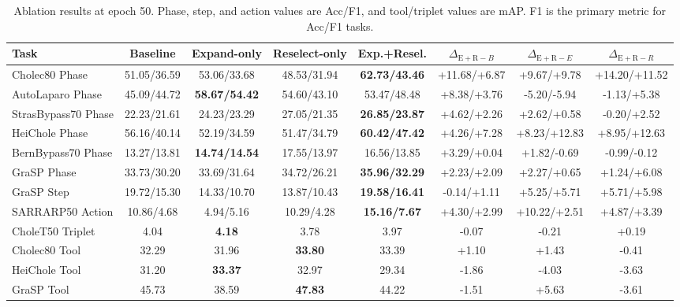 \begin{table}[t]
\centering
\scriptsize
\setlength{\tabcolsep}{2.4pt}
\renewcommand{\arraystretch}{1.04}
\caption{Ablation results at epoch 50. Phase, step, and action values are Acc/F1, and tool/triplet values are mAP. F1 is the primary metric for Acc/F1 tasks.}
\label{tab:ablation_results}
\begin{adjustbox}{max width=\textwidth}
\begin{tabular}{@{}lccccccc@{}}
\toprule
Task & Baseline & Expand-only & Reselect-only & Exp.+Resel. & $\Delta_{\mathrm{E+R}-B}$ & $\Delta_{\mathrm{E+R}-E}$ & $\Delta_{\mathrm{E+R}-R}$ \\
\midrule
Cholec80 Phase & 51.05/36.59 & 53.06/33.68 & 48.53/31.94 & \textbf{62.73/43.46} & +11.68/+6.87 & +9.67/+9.78 & +14.20/+11.52 \\
AutoLaparo Phase & 45.09/44.72 & \textbf{58.67/54.42} & 54.60/43.10 & 53.47/48.48 & +8.38/+3.76 & -5.20/-5.94 & -1.13/+5.38 \\
StrasBypass70 Phase & 22.23/21.61 & 24.23/23.29 & 27.05/21.35 & \textbf{26.85/23.87} & +4.62/+2.26 & +2.62/+0.58 & -0.20/+2.52 \\
HeiChole Phase & 56.16/40.14 & 52.19/34.59 & 51.47/34.79 & \textbf{60.42/47.42} & +4.26/+7.28 & +8.23/+12.83 & +8.95/+12.63 \\
BernBypass70 Phase & 13.27/13.81 & \textbf{14.74/14.54} & 17.55/13.97 & 16.56/13.85 & +3.29/+0.04 & +1.82/-0.69 & -0.99/-0.12 \\
GraSP Phase & 33.73/30.20 & 33.69/31.64 & 34.72/26.21 & \textbf{35.96/32.29} & +2.23/+2.09 & +2.27/+0.65 & +1.24/+6.08 \\
GraSP Step & 19.72/15.30 & 14.33/10.70 & 13.87/10.43 & \textbf{19.58/16.41} & -0.14/+1.11 & +5.25/+5.71 & +5.71/+5.98 \\
SARRARP50 Action & 10.86/4.68 & 4.94/5.16 & 10.29/4.28 & \textbf{15.16/7.67} & +4.30/+2.99 & +10.22/+2.51 & +4.87/+3.39 \\
CholeT50 Triplet & 4.04 & \textbf{4.18} & 3.78 & 3.97 & -0.07 & -0.21 & +0.19 \\
Cholec80 Tool & 32.29 & 31.96 & \textbf{33.80} & 33.39 & +1.10 & +1.43 & -0.41 \\
HeiChole Tool & 31.20 & \textbf{33.37} & 32.97 & 29.34 & -1.86 & -4.03 & -3.63 \\
GraSP Tool & 45.73 & 38.59 & \textbf{47.83} & 44.22 & -1.51 & +5.63 & -3.61 \\
\bottomrule
\end{tabular}
\end{adjustbox}
\end{table}

